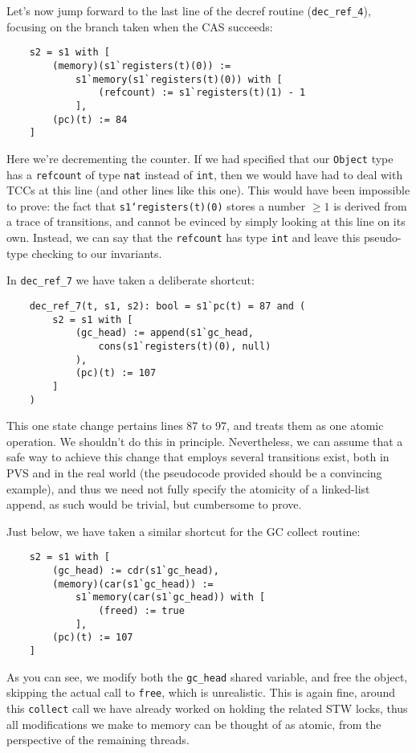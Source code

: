 Let's now jump forward to the last line of the decref routine (\texttt{dec\_ref\_4}), focusing on the branch taken when the CAS succeeds:
\begin{verbatim}
	s2 = s1 with [
	    (memory)(s1`registers(t)(0)) :=
	        s1`memory(s1`registers(t)(0)) with [
	            (refcount) := s1`registers(t)(1) - 1
	        ],
	    (pc)(t) := 84
	]
\end{verbatim}

Here we're decrementing the counter.
If we had specified that our \texttt{Object} type has a \texttt{refcount} of type \texttt{nat} instead of \texttt{int}, then we would have had to deal with TCCs at this line (and other lines like this one).
This would have been impossible to prove: the fact that \texttt{s1`registers(t)(0)} stores a number $\geq 1$ is derived from a trace of transitions, and cannot be evinced by simply looking at this line on its own.
Instead, we can say that the \texttt{refcount} has type \texttt{int} and leave this pseudo-type checking to our invariants.

In \texttt{{dec\_ref\_7}} we have taken a deliberate shortcut:
\begin{verbatim}
	dec_ref_7(t, s1, s2): bool = s1`pc(t) = 87 and (
	    s2 = s1 with [
	        (gc_head) := append(s1`gc_head,
	            cons(s1`registers(t)(0), null)
	        ),
	        (pc)(t) := 107
	    ]
	)
\end{verbatim}

This one state change pertains lines 87 to 97, and treats them as one atomic operation.
We shouldn't do this in principle.
Nevertheless, we can assume that a safe way to achieve this change that employs several transitions exist, both in PVS and in the real world (the pseudocode provided should be a convincing example), and thus we need not fully specify the atomicity of a linked-list append, as such would be trivial, but cumbersome to prove.

Just below, we have taken a similar shortcut for the GC collect routine:
\begin{verbatim}
	s2 = s1 with [
	    (gc_head) := cdr(s1`gc_head),
	    (memory)(car(s1`gc_head)) :=
            s1`memory(car(s1`gc_head)) with [
	            (freed) := true
	        ],
	    (pc)(t) := 107
	]
\end{verbatim}

As you can see, we modify both the \texttt{{gc\_head}} shared variable, and free the object, skipping the actual call to \texttt{free}, which is unrealistic.
This is again fine, around this \texttt{collect} call we have already worked on holding the related STW locks, thus all modifications we make to memory can be thought of as atomic, from the perspective of the remaining threads.

